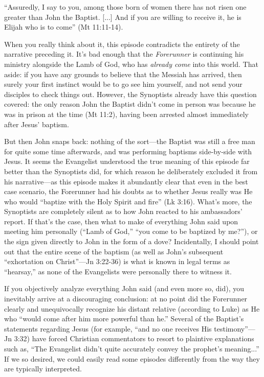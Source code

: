 \begin{smallquote}
    ``Assuredly, I say to you, among those born of women there has not risen one greater than John the Baptist. [...] And if you are willing to receive it, he is Elijah who is to come'' (Mt 11:11-14).
\end{smallquote}

When you really think about it, this episode contradicts the entirety of the
narrative preceding it. It's bad enough that the \emph{Forerunner} is continuing his
ministry alongside the Lamb of God, who has \emph{already come} into this world. That
aside: if you have any grounds to believe that the Messiah has arrived, then surely
your first instinct would be to go see him yourself, and not send your disciples to
check things out. However, the Synoptists already have this question covered: the
only reason John the Baptist didn't come in person was because he was in prison at
the time (Mt 11:2), having been arrested almost immediately after Jesus' baptism.

But then John snaps back: nothing of the sort---the Baptist was still a free man for quite some time afterwards, and was performing baptisms side-by-side with Jesus. It seems the Evangelist understood the true meaning of this episode far better than the Synoptists did, for which reason he deliberately excluded it from his narrative---as this episode makes it abundantly clear that even in the best case scenario, the Forerunner had his doubts as to whether Jesus really was He who would ``baptize with the Holy Spirit and fire'' (Lk 3:16). What's more, the Synoptists are completely silent as to how John reacted to his ambassadors' report. If that's the case, then what to make of everything John said upon meeting him personally (``Lamb of God,'' ``you come to be baptized by me?''), or the sign given directly to John in the form of a dove? Incidentally, I should point out that the entire scene of the baptism (as well as John's subsequent ``exhortation on Christ''---Jn 3:22-36) is what is known in legal terms as ``hearsay,'' as none of the Evangelists were personally there to witness it.

If you objectively analyze everything John said (and even more so, did), you inevitably arrive at a discouraging conclusion: at no point did the Forerunner clearly and unequivocally recognize his distant relative (according to Luke) as He who ``would come after him more powerful than he.'' Several of the Baptist's statements regarding Jesus (for example, ``and no one receives His testimony''---Jn 3:32) have forced Christian commentators to resort to plaintive explanations such as, ``The Evangelist didn't quite accurately convey the prophet's meaning...'' If we so desired, we could easily read some episodes differently from the way they are typically interpreted.

